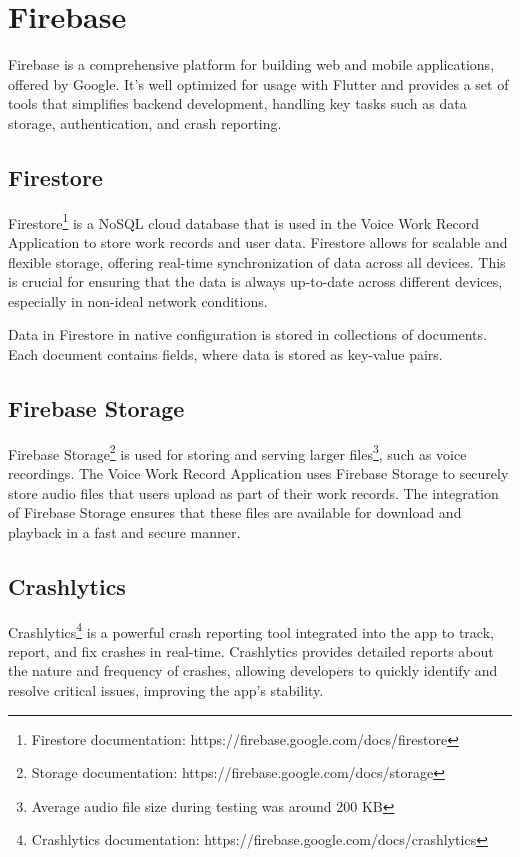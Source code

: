 \documentclass[
  digital,     %
  oneside,     %
  nosansbold,  %
  nocolorbold, %
  lof,         %
  lot,         %
]{fithesis4}
\begin{document}
\section{Firebase}
Firebase is a comprehensive platform for building web and mobile applications, offered by Google. It's well optimized for usage with Flutter and provides a set of tools that simplifies backend development, handling key tasks such as data storage, authentication, and crash reporting.

\subsection{Firestore}
Firestore\footnote{Firestore documentation: https://firebase.google.com/docs/firestore} is a \acrshort{NoSQL} cloud database that is used in the Voice Work Record Application to store work records and user data. Firestore allows for scalable and flexible storage, offering real-time synchronization of data across all devices. This is crucial for ensuring that the data is always up-to-date across different devices, especially in non-ideal network conditions.

Data in Firestore in native configuration is stored in collections of documents. Each document contains fields, where data is stored as key-value pairs.

\subsection{Firebase Storage}
Firebase Storage\footnote{Storage documentation: https://firebase.google.com/docs/storage} is used for storing and serving larger files\footnote{Average audio file size during testing was around 200 \acrshort{KB}}, such as voice recordings. The Voice Work Record Application uses Firebase Storage to securely store audio files that users upload as part of their work records. The integration of Firebase Storage ensures that these files are available for download and playback in a fast and secure manner.

\subsection{Crashlytics}
Crashlytics\footnote{Crashlytics documentation: https://firebase.google.com/docs/crashlytics} is a powerful crash reporting tool integrated into the app to track, report, and fix crashes in real-time. Crashlytics provides detailed reports about the nature and frequency of crashes, allowing developers to quickly identify and resolve critical issues, improving the app's stability.
\end{document}

